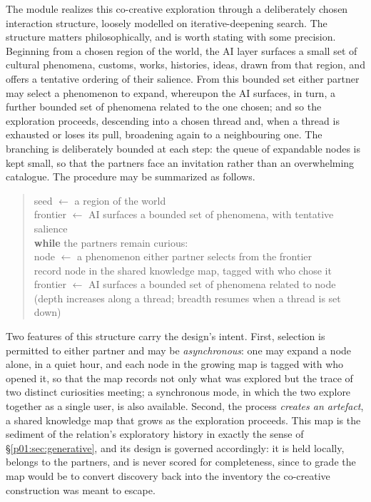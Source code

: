 The module realizes this co-creative exploration through a deliberately chosen interaction structure, loosely modelled on iterative-deepening search. The structure matters philosophically, and is worth stating with some precision. Beginning from a chosen region of the world, the AI layer surfaces a small set of cultural phenomena, customs, works, histories, ideas, drawn from that region, and offers a tentative ordering of their salience. From this bounded set either partner may select a phenomenon to expand, whereupon the AI surfaces, in turn, a further bounded set of phenomena related to the one chosen; and so the exploration proceeds, descending into a chosen thread and, when a thread is exhausted or loses its pull, broadening again to a neighbouring one. The branching is deliberately bounded at each step: the queue of expandable nodes is kept small, so that the partners face an invitation rather than an overwhelming catalogue. The procedure may be summarized as follows.

\begin{quote}\small\ttfamily
seed $\leftarrow$ a region of the world\\
frontier $\leftarrow$ AI surfaces a bounded set of phenomena, with tentative salience\\
\textbf{while} the partners remain curious:\\
\hspace*{1.5em}node $\leftarrow$ a phenomenon either partner selects from the frontier\\
\hspace*{1.5em}record node in the shared knowledge map, tagged with who chose it\\
\hspace*{1.5em}frontier $\leftarrow$ AI surfaces a bounded set of phenomena related to node\\
\hspace*{1.5em}(depth increases along a thread; breadth resumes when a thread is set down)
\end{quote}

\noindent Two features of this structure carry the design's intent. First, selection is permitted to either partner and may be \emph{asynchronous}: one may expand a node alone, in a quiet hour, and each node in the growing map is tagged with who opened it, so that the map records not only what was explored but the trace of two distinct curiosities meeting; a synchronous mode, in which the two explore together as a single user, is also available. Second, the process \emph{creates an artefact}, a shared knowledge map that grows as the exploration proceeds. This map is the sediment of the relation's exploratory history in exactly the sense of §\ref{p01:sec:generative}, and its design is governed accordingly: it is held locally, belongs to the partners, and is never scored for completeness, since to grade the map would be to convert discovery back into the inventory the co-creative construction was meant to escape.

